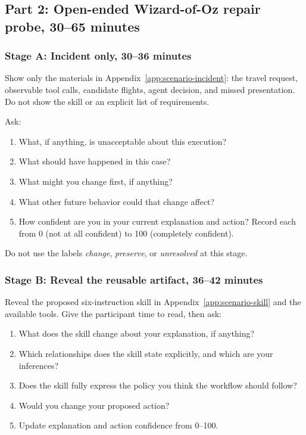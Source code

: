 \subsection{Part 2: Open-ended Wizard-of-Oz repair probe, 30--65 minutes}

\subsubsection{Stage A: Incident only, 30--36 minutes}

Show only the materials in Appendix~\ref{app:scenario-incident}: the travel
request, observable tool calls, candidate flights, agent decision, and missed
presentation. Do not show the skill or an explicit list of requirements.

Ask:

\begin{enumerate}[leftmargin=*]
    \item What, if anything, is unacceptable about this execution?
    \item What should have happened in this case?
    \item What might you change first, if anything?
    \item What other future behavior could that change affect?
    \item How confident are you in your current explanation and action? Record
    each from 0 (not at all confident) to 100 (completely confident).
\end{enumerate}

Do not use the labels \emph{change}, \emph{preserve}, or \emph{unresolved} at
this stage.

\subsubsection{Stage B: Reveal the reusable artifact, 36--42 minutes}

Reveal the proposed six-instruction skill in Appendix~\ref{app:scenario-skill}
and the available tools. Give the participant time to read, then ask:

\begin{enumerate}[leftmargin=*]
    \item What does the skill change about your explanation, if anything?
    \item Which relationships does the skill state explicitly, and which are
    your inferences?
    \item Does the skill fully express the policy you think the workflow should
    follow?
    \item Would you change your proposed action?
    \item Update explanation and action confidence from 0--100.
\end{enumerate}

